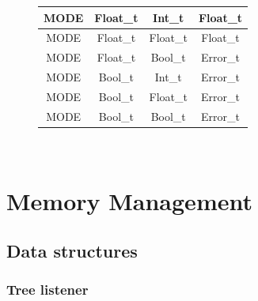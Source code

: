 \begin{figure}[H]
\begin{tabular}{cccc}
        \midrule MODE & Float\_t & Int\_t    & Float\_t \\
        \midrule MODE & Float\_t & Float\_t  & Float\_t \\
        \midrule MODE & Float\_t & Bool\_t   & Error\_t \\

        \midrule MODE & Bool\_t & Int\_t     & Error\_t \\
        \midrule MODE & Bool\_t & Float\_t   & Error\_t \\
        \midrule MODE & Bool\_t & Bool\_t    & Error\_t \\

        \bottomrule
    \end{tabular}\\
\end{figure}

\newpage

\section{Memory Management}

\subsection{Data structures}

\subsubsection{Tree listener}


